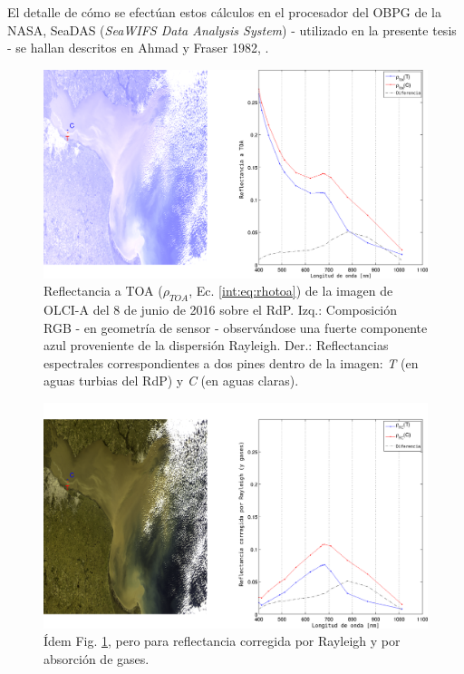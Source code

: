     El detalle de cómo se efectúan estos cálculos en el procesador del OBPG de la NASA, SeaDAS (\textit{SeaWIFS Data Analysis System}) - utilizado en la presente tesis - se hallan descritos en Ahmad y Fraser 1982, \cite{ahmad1982}.

    \begin{figure}
    \centering
    \includegraphics[width=\textwidth]{int/figures/RDP_TC_comparison_B_RHO.png}
    \caption[Reflectancia a TOA de la imagen de OLCI-A del 08-06-2016 sobre el RdP.]{Reflectancia a TOA ($\rho_{TOA}$, Ec. \ref{int:eq:rhotoa}) de la imagen de OLCI-A del 8 de junio de 2016 sobre el RdP. Izq.: Composición RGB - en geometría de sensor - observándose una fuerte componente azul proveniente de la dispersión Rayleigh. Der.: Reflectancias espectrales correspondientes a dos pines dentro de la imagen: \textit{T} (en aguas turbias del RdP) y \textit{C} (en aguas claras).}
    \label{int:RDP_TC_comparison_B_RHO}
    \end{figure}

    \begin{figure}
    \centering
    \includegraphics[width=\textwidth]{int/figures/RDP_TC_comparison_B_RHOGRC.png}
    \caption[Reflectancia RC de la imagen de OLCI-A del 08-06-2016 sobre el RdP.]{Ídem Fig. \ref{int:RDP_TC_comparison_B_RHO}, pero para reflectancia corregida por Rayleigh y por absorción de gases.}
    \label{int:RDP_TC_comparison_B_RHOGRC}
    \end{figure}

